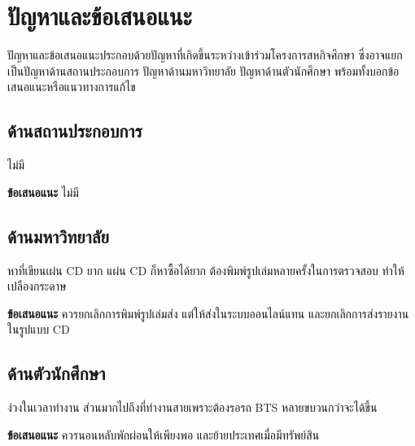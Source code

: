 \chapter{ปัญหาและข้อเสนอแนะ}
\label{chapter:result}

ปัญหาและข้อเสนอแนะประกอบด้วยปัญหาที่เกิดขึ้นระหว่างเข้าร่วมโครงการสหกิจศึกษา ซึ่งอาจแยกเป็นปัญหาด้านสถานประกอบการ ปัญหาด้านมหาวิทยาลัย ปัญหาด้านตัวนักศึกษา พร้อมทั้งบอกข้อเสนอแนะหรือแนวทางการแก้ไข 

\section{ด้านสถานประกอบการ}

ไม่มี

\textbf{ข้อเสนอแนะ} ไม่มี

\section{ด้านมหาวิทยาลัย}

หาที่เขียนเผ่น CD ยาก แผ่น CD ก็หาซื้อได้ยาก ต้องพิมพ์รูปเล่มหลายครั้งในการตรวจสอบ ทำให้เปลืองกระดาษ

\textbf{ข้อเสนอแนะ} ควรยกเลิกการพิมพ์รูปเล่มส่ง แต่ให้ส่งในระบบออนไลน์แทน และยกเลิกการส่งรายงานในรูปแบบ CD

\section{ด้านตัวนักศึกษา}

ง่วงในเวลาทำงาน ส่วนมากไปถึงที่ทำงานสายเพราะต้องรอรถ BTS หลายขบวนกว่าจะได้ขึ้น

\textbf{ข้อเสนอแนะ} ควรนอนหลับพักผ่อนให้เพียงพอ และย้ายประเทศเมื่อมีทรัพย์สิน